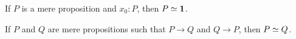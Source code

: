 \documentclass[hott-all.tex]{subfiles}
\begin{document}
\begin{lem}
  If $P$ is a mere proposition and $x_0:P$, then $P \simeq \mathbf{1}$.
\end{lem}
%

\begin{lem}
  If $P$ and $Q$ are mere propositions such that $P\to Q$ and $Q\to P$, then $P \simeq Q$.
\end{lem}
%
%
%
%
%
\end{document}
